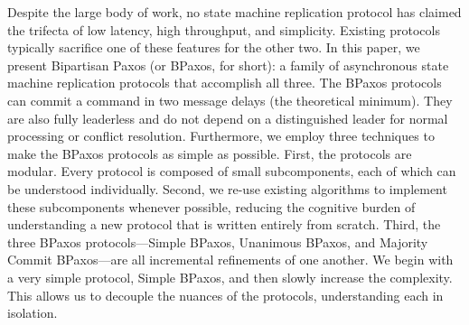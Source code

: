 Despite the large body of work, no state machine replication protocol has
claimed the trifecta of low latency, high throughput, and simplicity. Existing
protocols typically sacrifice one of these features for the other two. In this
paper, we present Bipartisan Paxos (or BPaxos, for short): a family of
asynchronous state machine replication protocols that accomplish all three. The
BPaxos protocols can commit a command in two message delays (the theoretical
minimum). They are also fully leaderless and do not depend on a distinguished
leader for normal processing or conflict resolution. Furthermore, we employ
three techniques to make the BPaxos protocols as simple as possible.
%
First, the protocols are modular. Every protocol is composed of small
subcomponents, each of which can be understood individually.
%
Second, we re-use existing algorithms to implement these subcomponents whenever
possible, reducing the cognitive burden of understanding a new protocol that is
written entirely from scratch.
%
Third, the three BPaxos protocols---Simple BPaxos, Unanimous BPaxos, and
Majority Commit BPaxos---are all incremental refinements of one another. We
begin with a very simple protocol, Simple BPaxos, and then slowly increase the
complexity. This allows us to decouple the nuances of the protocols,
understanding each in isolation.
